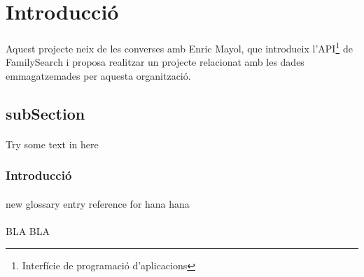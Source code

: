 \section{Introducció}
\paragraph{}
Aquest projecte neix de les converses amb Enric Mayol, que introdueix l'API\footnote{\label{foot-api}Interfície de programació d'aplicacions} de FamilySearch i proposa realitzar un projecte relacionat amb les dades emmagatzemades per aquesta organització.

\subsection{subSection}
\paragraph{}
Try some text in here

\subsubsection{Introducció}
\paragraph{}
new glossary entry reference for hana \gls{hana}

\paragraph{}
BLA BLA
